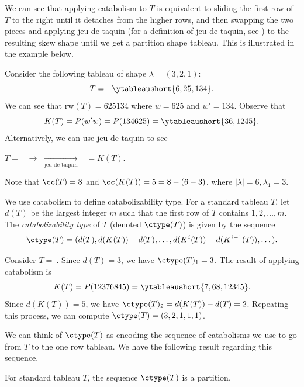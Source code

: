 We can see that applying catabolism to $T$ is equivalent to sliding the first row of $T$ to the right until it detaches from the higher rows, and then swapping the two pieces and applying jeu-de-taquin (for a definition of jeu-de-taquin, see \cite[Chapter 7.A1.2]{EC2}) to the resulting skew shape until we get a partition shape tableau. This is illustrated in the example below.

\begin{ex}   Consider the following tableau of shape $\lambda = (3,2,1)$: \[T = \ \ \ytableaushort{6,25,134}.\]
We can see that $\text{rw}(T) = 625134$ where $w = 625$ and $w' = 134$.  Observe that \[K(T) = P(w'w) =  P(134625) =  \ytableaushort{36,1245}.\]
Alternatively, we can use jeu-de-taquin to see
\begin{center}
$T = \ \ $ $\rightarrow$   $\xrightarrow[\text{jeu-de-taquin}]{}$   $\ \  = K(T).$
\end{center}
Note that $\cc(T) = 8$ and $\cc(K(T)) = 5 = 8 - (6-3)$, where $|\lambda| = 6, \lambda_1 = 3$.
\end{ex}

We use catabolism to define catabolizability type. For a standard tableau $T$, let $d(T)$ be the largest integer $m$ such that the first row of $T$ contains $1,2,\dots, m$.
The \textit{catabolizability type} of $T$ (denoted $\ctype(T)$) is given by the sequence
\begin{align}
    \ctype(T) = (d(T), d(K(T))-d(T), \dots, d(K^{i}(T)) - d(K^{i-1}(T)),\dots).
\end{align}

\begin{ex}\label{ex:cat using direct def}
    Consider 
$T =\  $. Since $d(T) = 3$, we have $\ctype(T)_1 = 3$.
The result of applying catabolism is \[K(T) = P(12376845) = \ytableaushort{7,68,12345}.\]
Since $d(K(T)) = 5$, we have $\ctype(T)_2 = d(K(T)) - d(T) = 2$.
Repeating this process, we can compute $\ctype(T) = (3,2,1,1,1)$.
\end{ex}

We can think of $\ctype(T)$ as encoding the sequence of catabolisms we use to go from $T$ to the one row tableau. We have the following result regarding this sequence.
\begin{prop}
    For standard tableau $T$, the sequence $\ctype(T)$ is a partition.
\end{prop}


